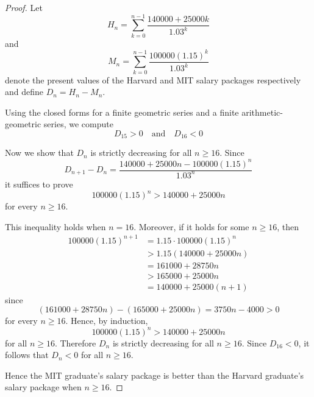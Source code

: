 \documentclass{article}
\begin{document}
\begin{proof}
    Let
    \[
    H_n = \sum_{k=0}^{n-1}\frac{140000 + 25000k}{1.03^k}
    \]
    and
    \[
    M_n = \sum_{k=0}^{n-1}\frac{100000(1.15)^k}{1.03^k}
    \]
    denote the present values of the Harvard and MIT salary packages respectively and 
    define $D_n = H_n - M_n$.

    \medskip

    Using the closed forms for a finite geometric series and a finite arithmetic-geometric 
    series, we compute
    \[
    D_{15} > 0 \quad \text{and} \quad D_{16} < 0
    \]

    \medskip

    Now we show that $D_n$ is strictly decreasing for all $n \ge 16$. Since
    \[
    D_{n+1} - D_n = \frac{140000 + 25000n - 100000(1.15)^n}{1.03^n}
    \]
    it suffices to prove
    \[
    100000(1.15)^n > 140000 + 25000n
    \]
    for every $n \ge 16$.

    \medskip

    This inequality holds when $n = 16$. Moreover, if it holds for some $n\ge16$, then
    \[
    \begin{aligned}
    100000(1.15)^{n + 1} &= 1.15 \cdot 100000(1.15)^n \\
    &> 1.15(140000 + 25000n) \\
    &= 161000 + 28750n \\
    &> 165000 + 25000n \\
    &= 140000 + 25000(n + 1)
    \end{aligned}
    \]
    since
    \[
    (161000 + 28750n) - (165000 + 25000n) = 3750n - 4000 > 0
    \]
    for every $n \ge 16$. Hence, by induction,
    \[
    100000(1.15)^n > 140000 + 25000n
    \]
    for all $n \ge 16$. Therefore $D_n$ is strictly decreasing for all $n \ge 16$. 
    Since $D_{16} < 0$, it follows that $D_n < 0$ for all $n \ge 16$.

    \medskip

    Hence the MIT graduate's salary package is better than the Harvard graduate's salary 
    package when $n \geq 16$.
\end{proof}
\end{document}
